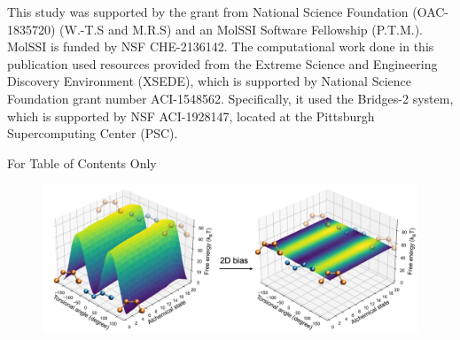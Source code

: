 \documentclass[journal=jacsat,manuscript=article]{achemso}
\begin{document}
\begin{acknowledgement}
This study was supported by the grant from National Science Foundation (OAC-1835720) (W.-T.S and M.R.S) and an MolSSI Software Fellowship (P.T.M.). MolSSI is funded by NSF CHE-2136142.  The computational work done in this publication used resources provided from the Extreme Science and Engineering Discovery Environment (XSEDE), which is supported by National Science Foundation grant number ACI-1548562. Specifically, it used the Bridges-2 system, which is supported by NSF  ACI-1928147, located at the Pittsburgh Supercomputing Center (PSC). 

\end{acknowledgement}



%


\clearpage
For Table of Contents Only
\begin{figure}[H]
    \centering
    \includegraphics[width=\textwidth]{Figures/graphic_abstract.jpg}   
    \caption{}
\end{figure}
\end{document}
